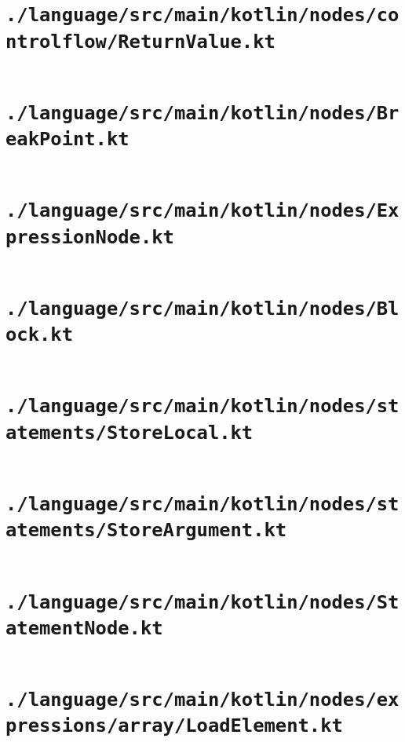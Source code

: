 \documentclass[a4paper, 11pt]{report}
\begin{document}
    \section{\lstinline{./language/src/main/kotlin/nodes/controlflow/ReturnValue.kt}}
    \inputminted{kotlin}{./language/src/main/kotlin/nodes/controlflow/ReturnValue.kt}


    \section{\lstinline{./language/src/main/kotlin/nodes/BreakPoint.kt}}
    \inputminted{kotlin}{./language/src/main/kotlin/nodes/BreakPoint.kt}


    \section{\lstinline{./language/src/main/kotlin/nodes/ExpressionNode.kt}}
    \inputminted{kotlin}{./language/src/main/kotlin/nodes/ExpressionNode.kt}


    \section{\lstinline{./language/src/main/kotlin/nodes/Block.kt}}
    \inputminted{kotlin}{./language/src/main/kotlin/nodes/Block.kt}


    \section{\lstinline{./language/src/main/kotlin/nodes/statements/StoreLocal.kt}}
    \inputminted{kotlin}{./language/src/main/kotlin/nodes/statements/StoreLocal.kt}


    \section{\lstinline{./language/src/main/kotlin/nodes/statements/StoreArgument.kt}}
    \inputminted{kotlin}{./language/src/main/kotlin/nodes/statements/StoreArgument.kt}


    \section{\lstinline{./language/src/main/kotlin/nodes/StatementNode.kt}}
    \inputminted{kotlin}{./language/src/main/kotlin/nodes/StatementNode.kt}


    \section{\lstinline{./language/src/main/kotlin/nodes/expressions/array/LoadElement.kt}}
    \inputminted{kotlin}{./language/src/main/kotlin/nodes/expressions/array/LoadElement.kt}
\end{document}
